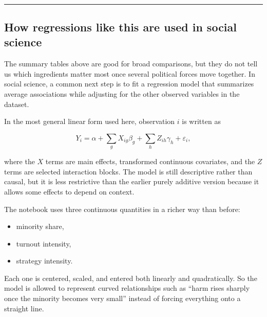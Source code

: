 \documentclass[11pt]{article}
\providecommand{\tightlist}{%
      \setlength{\itemsep}{0pt}\setlength{\parskip}{0pt}}
\begin{document}
    \begin{center}
    \end{center}
    { \hspace*{\fill} \\}
    
    \begin{center}\rule{0.5\linewidth}{0.5pt}\end{center}

\subsection{How regressions like this are used in social
science}\label{how-regressions-like-this-are-used-in-social-science}

The summary tables above are good for broad comparisons, but they do not
tell us which ingredients matter most once several political forces move
together. In social science, a common next step is to fit a regression
model that summarizes average associations while adjusting for the other
observed variables in the dataset.

In the most general linear form used here, observation \(i\) is written
as

\[
Y_i = \alpha + \sum_g X_{ig} \beta_g + \sum_h Z_{ih} \gamma_h + \varepsilon_i,
\]

where the \(X\) terms are main effects, transformed continuous
covariates, and the \(Z\) terms are selected interaction blocks. The
model is still descriptive rather than causal, but it is less
restrictive than the earlier purely additive version because it allows
some effects to depend on context.

The notebook uses three continuous quantities in a richer way than
before:

\begin{itemize}
\tightlist
\item
  minority share,
\item
  turnout intensity,
\item
  strategy intensity.
\end{itemize}

Each one is centered, scaled, and entered both linearly and
quadratically. So the model is allowed to represent curved relationships
such as ``harm rises sharply once the minority becomes very small''
instead of forcing everything onto a straight line.
\end{document}
